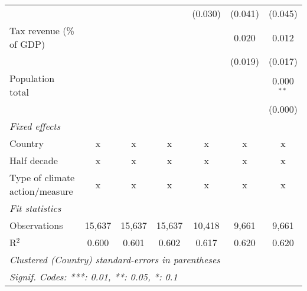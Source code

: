 \begin{tabular}{lcccccc}
                                                           &         &                &                & (0.030)        & (0.041)        & (0.045)\\   
   Tax revenue (\% of GDP)                                 &         &                &                &                & 0.020          & 0.012\\   
                                                           &         &                &                &                & (0.019)        & (0.017)\\   
   Population total                                        &         &                &                &                &                & 0.000$^{**}$\\   
                                                           &         &                &                &                &                & (0.000)\\   
   \emph{Fixed effects}\\
   Country                                                 & x       & x              & x              & x              & x              & x\\  
   Half decade                                             & x       & x              & x              & x              & x              & x\\  
   Type of climate action/measure                          & x       & x              & x              & x              & x              & x\\  
   \midrule \emph{Fit statistics}\\
   Observations                                            & 15,637  & 15,637         & 15,637         & 10,418         & 9,661          & 9,661\\  
   R$^2$                                                   & 0.600   & 0.601          & 0.602          & 0.617          & 0.620          & 0.620\\  
   \midrule
   \multicolumn{7}{l}{\emph{Clustered (Country) standard-errors in parentheses}}\\
   \multicolumn{7}{l}{\emph{Signif. Codes: ***: 0.01, **: 0.05, *: 0.1}}\\
\end{tabular}
\par\endgroup


